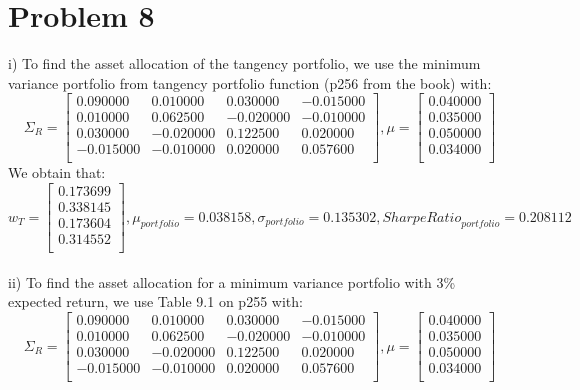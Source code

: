 \documentclass{article}
\begin{document}
\section*{Problem 8}
i) To find the asset allocation of the tangency portfolio, we use the minimum variance portfolio from tangency portfolio function (p256 from the book) with:
\begin{equation*}
\Sigma_{R}=%
\begin{bmatrix}{}
 0.090000 & 0.010000 & 0.030000 & -0.015000 \\ 
  0.010000 & 0.062500 & -0.020000 & -0.010000 \\ 
  0.030000 & -0.020000 & 0.122500 & 0.020000 \\ 
  -0.015000 & -0.010000 & 0.020000 & 0.057600 \\ 
  \end{bmatrix},
\mu = \begin{bmatrix}{}
 0.040000 \\ 
  0.035000 \\ 
  0.050000 \\ 
  0.034000 \\ 
  \end{bmatrix}
\end{equation*}
We obtain that:
\begin{equation*}
w_{T} = %
\begin{bmatrix}{}
 0.173699 \\ 
  0.338145 \\ 
  0.173604 \\ 
  0.314552 \\ 
  \end{bmatrix}, 
\mu_{portfolio} = 0.038158,
\sigma_{portfolio} = 0.135302,
{Sharpe Ratio}_{portfolio} = 0.208112
\end{equation*}
\vspace{5mm} \\
ii) To find the asset allocation for a minimum variance portfolio with 3\% expected return, we use Table 9.1 on p255 with:
\begin{equation*}
\Sigma_{R}=%
\begin{bmatrix}{}
 0.090000 & 0.010000 & 0.030000 & -0.015000 \\ 
  0.010000 & 0.062500 & -0.020000 & -0.010000 \\ 
  0.030000 & -0.020000 & 0.122500 & 0.020000 \\ 
  -0.015000 & -0.010000 & 0.020000 & 0.057600 \\ 
  \end{bmatrix},
\mu = \begin{bmatrix}{}
 0.040000 \\ 
  0.035000 \\ 
  0.050000 \\ 
  0.034000 \\ 
  \end{bmatrix}
\end{equation*}
\end{document}
